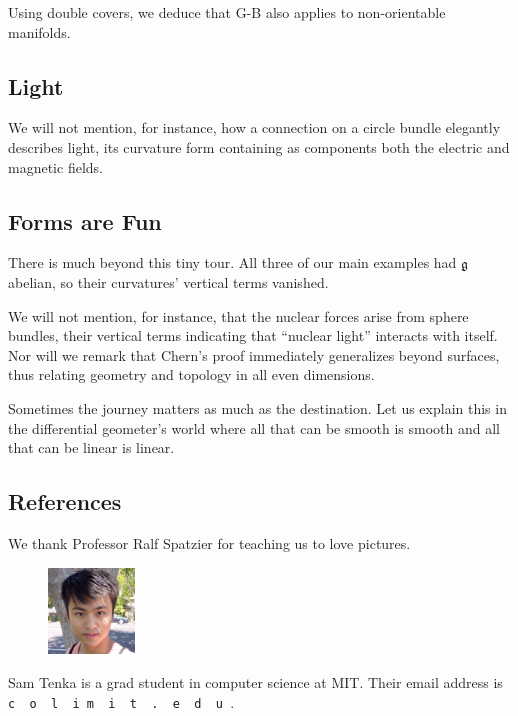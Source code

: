 \documentclass[twocolumn, 11pt]{article}
\newcommand{\gG}{\frak{g}}
\theoremstyle{definition}
\newcommand{\msec}[1]{\subsection*{\color{mblu}\textsf{#1}}}
\begin{document}
        Using double covers, we deduce that G-B also applies to non-orientable
        manifolds.

    \msec{Light}
        We will not mention, for
        instance, how a connection on a circle bundle elegantly describes
        light, its curvature form containing as components both the electric
        and magnetic fields. 

    \msec{Forms are Fun}
        There is much beyond this tiny tour.  All three of our main examples
        had $\gG$ abelian, so their curvatures' vertical terms vanished.

        We will not mention, for
        instance, that the nuclear forces arise from sphere
        bundles, their vertical terms indicating that ``nuclear
        light'' interacts with itself.  Nor will we remark that Chern's proof
        immediately generalizes beyond surfaces, thus relating geometry and
        topology in all even dimensions. 

        Sometimes the journey matters as much as the destination.  Let us
        explain this in the differential geometer's world where all that can be
        smooth is smooth and all that can be linear is linear.


    \msec{References}
        We thank Professor Ralf Spatzier for teaching us to love
        pictures.

        \hrulefill
        \vspace{0.1cm}
            \begin{figure}
                \vspace{-0.4cm}
                    \includegraphics[height=2.3cm]{sam}
            \end{figure}
        \normalsize
        Sam Tenka is a grad student in computer science 
        at MIT.  Their email address is
        \texttt{
            c{\tiny\ }%
            o{\tiny\ }%
            l{\tiny\ }%
            i{\tiny@}%
            m{\tiny\ }%
            i{\tiny\ }%
            t{\tiny\ }%
            .{\tiny\ }%
            e{\tiny\ }%
            d{\tiny\ }%
            u%
        }.
\end{document}
